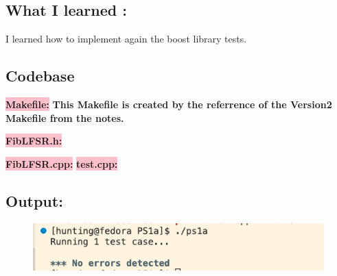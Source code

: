 \subsection{What I learned :}\label{sec:ps1a:learn}

I learned how to implement again the boost library tests. 


\subsection{Codebase}\label{sec:ps1a:code}

\colorbox{pink}{\textbf{Makefile:}} \newline \textbf{This Makefile is created by the referrence of the Version2 Makefile from the notes.}



\colorbox{pink}{\textbf{FibLFSR.h:}} \newline 


\colorbox{pink}{\textbf{FibLFSR.cpp:}}
\colorbox{pink}{\textbf{test.cpp:}}


\subsection{Output:}\label{sec:ps1b:output}
\begin{figure}[h]
    \centering
    \includegraphics[width=1\textwidth]{projectPictures/ps1a.png}

    \label{fig:output}
\end{figure}

